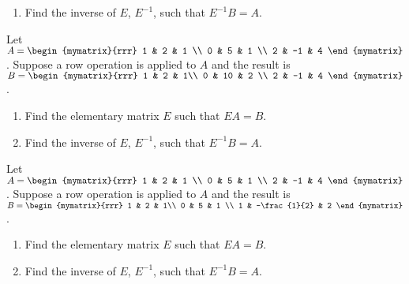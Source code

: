 \begin{enumialphparenastyle}
\begin{ex}
\begin{enumerate}
\item Find the inverse of $E$, $E^{-1}$, such that $E^{-1}B = A$.
\end{enumerate}
\end{ex}

\begin{ex} 
Let $A = \begin{mymatrix}{rrr}
1 & 2 & 1  \\
0 & 5 & 1 \\
2 & -1 & 4
\end{mymatrix}$. Suppose a row operation is applied to $A$ and the result is $B = \begin{mymatrix}{rrr}
1 & 2 & 1\\
0 & 10 & 2 \\
2 & -1 & 4  
\end{mymatrix}$. 
\begin{enumerate}
\item Find the elementary matrix $E$ such that $EA = B$. 

\item Find the inverse of $E$, $E^{-1}$, such that $E^{-1}B = A$.
\end{enumerate}
\end{ex}


\begin{ex} 
Let $A = \begin{mymatrix}{rrr}
1 & 2 & 1  \\
0 & 5 & 1 \\
2 & -1 & 4
\end{mymatrix}$. Suppose a row operation is applied to $A$ and the result is $B = \begin{mymatrix}{rrr}
1 & 2 & 1\\
0 & 5 & 1 \\
1 & -\frac{1}{2} & 2  
\end{mymatrix}$. 
\begin{enumerate}
\item Find the elementary matrix $E$ such that $EA = B$. 

\item Find the inverse of $E$, $E^{-1}$, such that $E^{-1}B = A$.
\end{enumerate}
\end{ex}



\end{enumialphparenastyle}

